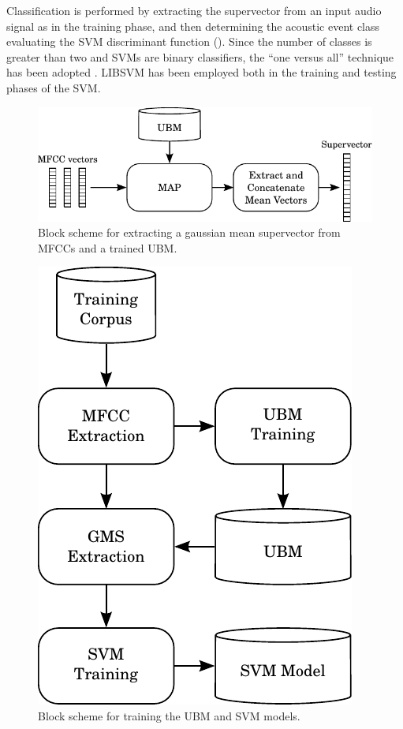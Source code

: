 Classification is performed by extracting the supervector from an input audio signal as in the training phase, and then determining the acoustic event class evaluating the SVM discriminant function (). Since the number of classes is greater than two and SVMs are binary classifiers, the ``one versus all''  technique has been adopted \cite{bishop06}. LIBSVM \cite{chang11} has been employed both in the training and testing phases of the SVM.

\begin{figure}[t]
	\centering
	\includegraphics[width=\columnwidth]{img/gms_bn.pdf}
	\caption{Block scheme for extracting a gaussian mean supervector from MFCCs and a trained UBM.} \label{fig:gms}
\end{figure}

\begin{figure}[t]
	\centering
	\includegraphics[width=0.5\columnwidth]{img/training_scheme.pdf}
	\caption{Block scheme for training the UBM and SVM models.}
	\label{fig:training-scheme}
\end{figure}


